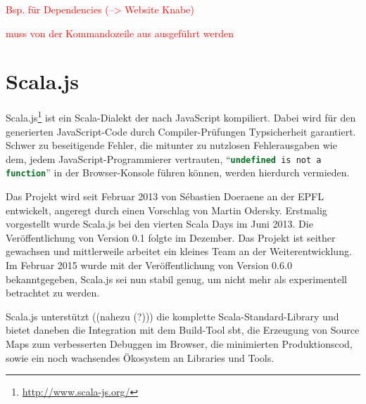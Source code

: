 \documentclass[a4paper, 12pt, hidelinks, listof=totoc, listoftables=totoc, bibliography=totoc]{scrreprt}
\newcommand{\js}[1]{\lstinline[language=JavaScript, style=inline]|#1|}
\newcommand{\TODO}[1]{\textcolor{red}{#1}\newline}
\begin{document}
\TODO{Bsp. für Dependencies (-->  Website Knabe)}

\TODO{muss von der Kommandozeile aus ausgeführt werden}


\chapter{Scala.js}\label{chap:scala.js}

Scala.js\footnote{\url{http://www.scala-js.org/}} ist ein Scala-Dialekt der nach JavaScript kompiliert\cite[S. 1]{doeraene2013.TDI}. Dabei wird für den generierten JavaScript-Code durch Compiler-Prüfungen Typsicherheit garantiert. Schwer zu beseitigende Fehler, die mitunter zu nutzlosen Fehlerausgaben wie dem, jedem JavaScript-Programmierer vertrauten, "`\js{undefined is not a function}"' in der Browser-Konsole führen können, werden hierdurch vermieden.

Das Projekt wird seit Februar 2013 von Sébastien Doeraene an der \ac{EPFL} entwickelt, angeregt durch einen Vorschlag von Martin Odersky.\cite{doeraene2013.CSJ} Erstmalig vorgestellt wurde Scala.js bei den vierten Scala Days im Juni 2013. Die Veröffentlichung von Version 0.1 folgte im Dezember. Das Projekt ist seither gewachsen und mittlerweile arbeitet ein kleines Team an der Weiterentwicklung. Im Februar 2015 wurde mit der Veröffentlichung von Version 0.6.0 bekanntgegeben, Scala.js sei nun stabil genug, um nicht mehr als experimentell betrachtet zu werden.\cite{doeraene2015.SNL}

Scala.js unterstützt ((nahezu (?))) die komplette Scala-Standard-Library und bietet daneben die Integration mit dem Build-Tool sbt, die Erzeugung von Source Maps zum verbesserten Debuggen im Browser, die minimierten Produktionscod, sowie ein noch wachsendes Ökosystem an Libraries und Tools.
\end{document}
